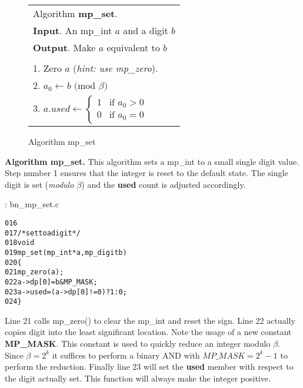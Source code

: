\documentclass[b5paper]{book}
\begin{document}
\newpage\begin{figure}
\begin{center}
\begin{tabular}{l}
\hline Algorithm \textbf{mp\_set}. \\
\textbf{Input}.   An mp\_int $a$ and a digit $b$ \\
\textbf{Output}.  Make $a$ equivalent to $b$ \\
\hline \\
1.  Zero $a$ (\textit{hint: use mp\_zero}). \\
2.  $a_0 \leftarrow b \mbox{ (mod }\beta\mbox{)}$ \\
3.  $a.used \leftarrow  \left \lbrace \begin{array}{ll}
                              1 &  \mbox{if }a_0 > 0 \\
                              0 &  \mbox{if }a_0 = 0 
                              \end{array} \right .$ \\
\hline                              
\end{tabular}
\end{center}
\caption{Algorithm mp\_set}
\end{figure}

\textbf{Algorithm mp\_set.}
This algorithm sets a mp\_int to a small single digit value.  Step number 1 ensures that the integer is reset to the default state.  The
single digit is set (\textit{modulo $\beta$}) and the \textbf{used} count is adjusted accordingly.

\vspace{+3mm}\begin{small}
\hspace{-5.1mm}{\bf File}: bn\_mp\_set.c
\vspace{-3mm}
\begin{alltt}
016   
017   /* set to a digit */
018   void
019   mp_set (mp_int * a, mp_digit b)
020   \{
021     mp_zero (a);
022     a->dp[0] = b & MP_MASK;
023     a->used = (a->dp[0] != 0) ? 1 : 0;
024   \}
\end{alltt}
\end{small}

Line 21 calls mp\_zero() to clear the mp\_int and reset the sign.  Line 22 actually copies digit 
into the least significant location.  Note the usage of a new constant \textbf{MP\_MASK}.  This constant is used to quickly
reduce an integer modulo $\beta$.  Since $\beta = 2^k$ it suffices to perform a binary AND with $MP\_MASK = 2^k - 1$ to perform
the reduction.  Finally line 23 will set the \textbf{used} member with respect to the digit actually set. This function 
will always make the integer positive.
\end{document}
